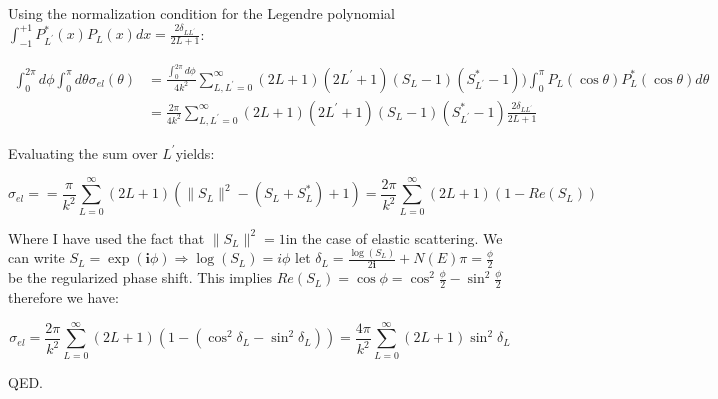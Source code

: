 \documentclass[fleqn, 12pt]{article}
\begin{document}
\begin{enumerate}
Using the normalization condition for the Legendre polynomial $\int_{-1}^{+1}P_{L^{\prime}}^{*}(x)P_{L}(x)dx=\frac{2\delta_{LL^{\prime}}}{2L+1}$:

\begin{eqnarray*}
\int_{0}^{2\pi}d\phi\int_{0}^{\pi}d\theta\sigma_{el}\left(\theta\right) & =\frac{\int_{0}^{2\pi}d\phi}{4k^{2}}\sum_{L,L^{\prime}=0}^{\infty}\left(2L+1\right)\left(2L^{\prime}+1\right)\left(S_{L}-1\right)\left(S_{L^{\prime}}^{*}-1\right))\int_{0}^{\pi}P_{L}\left(\cos\theta\right)P_{L}^{*}\left(\cos\theta\right)d\theta\\
 & =\frac{2\pi}{4k^{2}}\sum_{L,L^{\prime}=0}^{\infty}\left(2L+1\right)\left(2L^{\prime}+1\right)\left(S_{L}-1\right)\left(S_{L^{\prime}}^{*}-1\right)\frac{2\delta_{LL^{\prime}}}{2L+1}
\end{eqnarray*}


Evaluating the sum over $L^{\prime}$yields:

\[
\sigma_{el}==\frac{\pi}{k^{2}}\sum_{L=0}^{\infty}\left(2L+1\right)\left(\|S_{L}\|^{2}-\left(S_{L}+S_{L}^{*}\right)+1\right)=\frac{2\pi}{k^{2}}\sum_{L=0}^{\infty}\left(2L+1\right)\left(1-Re(S_{L})\right)
\]


Where I have used the fact that $\|S_{L}\|^{2}=1$in the case of elastic
scattering. We can write $S_{L}=\exp(\mathbf{i}\phi)\Rightarrow\log(S_{L})=i\phi$
let $\delta_{L}=\frac{\log(S_{L})}{2\mathbf{i}}+N(E)\pi=\frac{\phi}{2}$
be the regularized phase shift. This implies $Re(S_{L})=\cos\phi=\cos^{2}\frac{\phi}{2}-\sin^{2}\frac{\phi}{2}$
therefore we have:

\[
\sigma_{el}=\frac{2\pi}{k^{2}}\sum_{L=0}^{\infty}\left(2L+1\right)\left(1-\left(\cos^{2}\delta_{L}-\sin^{2}\delta_{L}\right)\right)=\frac{4\pi}{k^{2}}\sum_{L=0}^{\infty}\left(2L+1\right)\sin^{2}\delta_{L}
\]


QED.


\end{enumerate}
\end{document}
